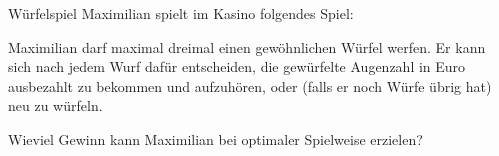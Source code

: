 \documentclass{uebungszettel}
\begin{document}
\pagestyle{empty}


\begin{aufgabe}{Würfelspiel}
  Maximilian spielt im Kasino folgendes Spiel:

  \begin{addmargin}{1cm}
    Maximilian darf maximal dreimal einen gewöhnlichen Würfel werfen.
    Er kann sich nach jedem Wurf dafür entscheiden, die gewürfelte Augenzahl in Euro ausbezahlt zu bekommen und aufzuhören, oder (falls er noch Würfe übrig hat) neu zu würfeln.
  \end{addmargin}

  Wieviel Gewinn kann Maximilian bei optimaler Spielweise erzielen?
\end{aufgabe}
\end{document}

